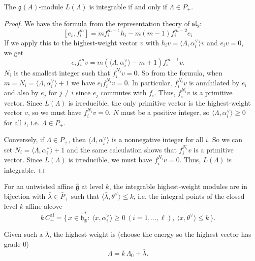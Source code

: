 \documentclass[12pt]{article}
\begin{document}
\begin{lemma}
    The $\mathfrak{g}(A)$-module $L(\Lambda)$ is integrable if and only if $\Lambda \in P_+$.
\end{lemma}

\begin{proof}
    We have the formula from the representation theory of $\mathfrak{sl}_2$:
    \[[e_i, f_i^{m}] = m f_i^{m-1} h_i - m(m-1) f_i^{m-2} e_i\]
    If we apply this to the highest-weight vector $v$ with $h_i v = \langle \Lambda, \alpha_i^\vee\rangle v$ and $e_i v = 0$, we get
    \[
        e_i f_i^{m} v = m (\langle \Lambda, \alpha_i^\vee\rangle - m + 1) f_i^{m-1} v.
    \]
    $N_i$ is the smallest integer such that $f_i^{N_i} v = 0$. So from the formula, when $m=N_i=\langle\Lambda,\alpha_i^\vee\rangle+1$ we have $e_i f_i^{N_i} v = 0$. In particular, $f_i^{N_i} v$ is annihilated by $e_i$ and also by $e_j$ for $j\neq i$ since $e_j$ commutes with $f_i$. Thus, $f_i^{N_i} v$ is a primitive vector. Since $L(\Lambda)$ is irreducible, the only primitive vector is the highest-weight vector $v$, so we must have $f_i^{N_i} v = 0$. $N$ must be a positive integer, so $\langle\Lambda,\alpha_i^\vee\rangle\geq 0$ for all $i$, i.e. $\Lambda\in P_+$.

    Conversely, if $\Lambda\in P_+$, then $\langle\Lambda,\alpha_i^\vee\rangle$ is a nonnegative integer for all $i$. So we can set $N_i = \langle\Lambda,\alpha_i^\vee\rangle + 1$ and the same calculation shows that $f_i^{N_i} v$ is a primitive vector. Since $L(\Lambda)$ is irreducible, we must have $f_i^{N_i} v = 0$. Thus, $L(\Lambda)$ is integrable.
\end{proof}

\begin{corollary}
    For an untwisted affine $\widehat{\mathfrak g}$ at level $k$, the integrable highest-weight modules are in bijection with $\bar\lambda\in \bar P_+$ such that $\langle \bar\lambda,\theta^\vee\rangle \le k$, i.e. the integral points of the closed level-$k$ affine alcove
    \[k\,C^{\text{af}}_+ = \{\,x\in \bar{\mathfrak h}^*_\mathbb{R}:\ \langle x,\alpha_i^\vee\rangle\ge0\ (i=1,\dots,\ell),\ \langle x,\theta^\vee\rangle\le k\,\}.\]

    Given such a $\bar\lambda$, the highest weight is (choose the energy so the highest vector has grade 0)
    \[\Lambda = k\,\Lambda_0 + \bar\lambda.\]
\end{corollary}
\end{document}
